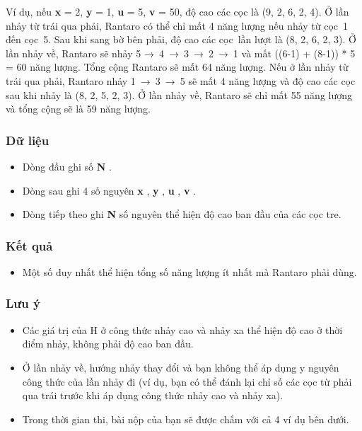    Ví dụ, nếu   \textbf{    x   }   = 2,   \textbf{    y   }   = 1,   \textbf{    u   }   = 5,   \textbf{    v   }   = 50, độ cao các cọc là (9, 2, 6, 2, 4). Ở lần nhảy từ trái qua phải,   Rantaro   có thể chỉ mất 4 năng lượng nếu nhảy từ cọc 1 đến cọc 5. Sau khi sang bờ bên phải, độ cao các cọc lần lượt là (8, 2, 6, 2, 3). Ở lần nhảy về,   Rantaro   sẽ nhảy 5 → 4 → 3 → 2 → 1 và mất ((6-1) + (8-1)) * 5 = 60 năng lượng. Tổng cộng   Rantaro   sẽ mất 64 năng lượng. Nếu ở lần nhảy từ trái qua phải,   Rantaro   nhảy 1 → 3 → 5 sẽ mất 4 năng lượng và độ cao các cọc sau khi nhảy là (8, 2, 5, 2, 3). Ở lần nhảy về,   Rantaro   sẽ chỉ mất 55 năng lượng và tổng cộng sẽ là 59 năng lượng.  

\subsubsection{   Dữ liệu  }
\begin{itemize}
	\item     Dòng đầu ghi số    \textbf{     N    }    .   
	\item     Dòng sau ghi 4 số nguyên    \textbf{     x    }    ,    \textbf{     y    }    ,    \textbf{     u    }    ,    \textbf{     v    }    .   
	\item     Dòng tiếp theo ghi    \textbf{     N    }    số nguyên thể hiện độ cao ban đầu của các cọc tre.   
\end{itemize}

\subsubsection{   Kết quả  }
\begin{itemize}
	\item     Một số duy nhất thể hiện tổng số năng lượng ít nhất mà    Rantaro    phải dùng.   
\end{itemize}

\subsubsection{   Lưu ý  }
\begin{itemize}
	\item     Các giá trị của H ở công thức nhảy cao và nhảy xa thể hiện độ cao ở thời điểm nhảy, không phải độ cao ban đầu.   
	\item     Ở lần nhảy về, hướng nhảy thay đổi và bạn không thể áp dụng y nguyên công thức của lần nhảy đi (ví dụ, bạn có thể đánh lại chỉ số các cọc từ phải qua trái trước khi áp dụng công thức nhảy cao và nhảy xa).   
	\item     Trong thời gian thi, bài nộp của bạn sẽ được chấm với cả 4 ví dụ bên dưới.   
\end{itemize}

